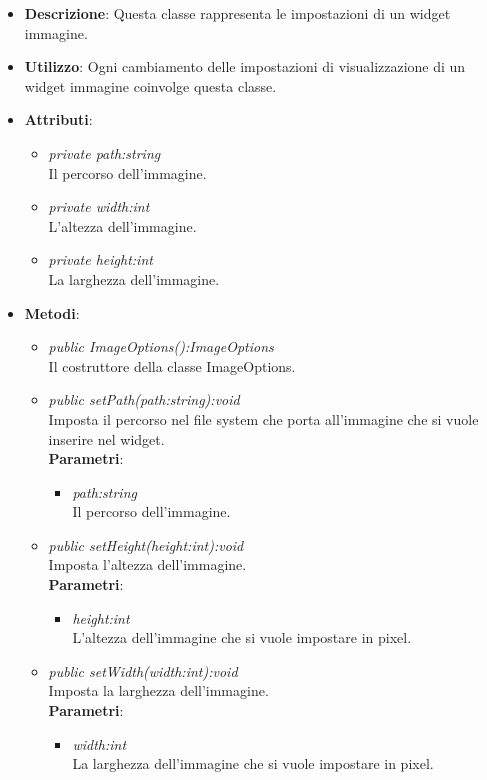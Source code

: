 \begin{itemize}
\item \textbf{Descrizione}: Questa classe rappresenta le impostazioni di un widget immagine.
\item \textbf{Utilizzo}: Ogni cambiamento delle impostazioni di visualizzazione di un widget immagine coinvolge questa classe.
\item \textbf{Attributi}:
	\begin{itemize}
	\item \textit{private path:string}\\
	Il percorso dell'immagine.
	\item \textit{private width:int}\\
	L'altezza dell'immagine. 
	\item \textit{private height:int}\\
	La larghezza dell'immagine. 
	\end{itemize}
\item \textbf{Metodi}:
	\begin{itemize}
	\item \textit{public ImageOptions():ImageOptions}\\
	Il costruttore della classe ImageOptions.
	\item \textit{public setPath(path:string):void}\\
	Imposta il percorso nel file system che porta all'immagine che si vuole inserire nel widget.
		\\ \textbf{Parametri}: \begin{itemize}
		\item \textit{path:string}\\
		Il percorso dell'immagine.
		\end{itemize} 
	\item \textit{public setHeight(height:int):void}\\
	Imposta l'altezza dell'immagine.
		\\ \textbf{Parametri}: \begin{itemize}
		\item \textit{height:int}\\
		L'altezza dell'immagine che si vuole impostare  in pixel.
		\end{itemize} 
	\item \textit{public setWidth(width:int):void}\\
	Imposta la larghezza dell'immagine.
		\\ \textbf{Parametri}: \begin{itemize}
		\item \textit{width:int}\\
		La larghezza dell'immagine che si vuole impostare  in pixel.
		\end{itemize} 
	\end{itemize}
\end{itemize}